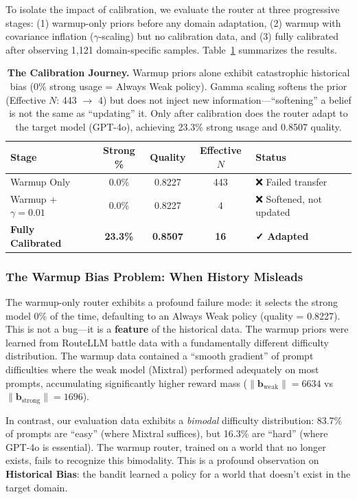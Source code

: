 To isolate the impact of calibration, we evaluate the router at three progressive stages: (1) warmup-only priors before any domain adaptation, (2) warmup with covariance inflation ($\gamma$-scaling) but no calibration data, and (3) fully calibrated after observing 1,121 domain-specific samples. Table~\ref{tab:calibration_stages} summarizes the results.

\begin{table}[h]
\centering
\small
\begin{tabular}{@{}lcccl@{}}
\toprule
\textbf{Stage} & \textbf{Strong \%} & \textbf{Quality} & \textbf{Effective $N$} & \textbf{Status} \\ \midrule
Warmup Only & 0.0\% & 0.8227 & 443 & ❌ Failed transfer \\
Warmup + $\gamma=0.01$ & 0.0\% & 0.8227 & 4 & ❌ Softened, not updated \\
\textbf{Fully Calibrated} & \textbf{23.3\%} & \textbf{0.8507} & \textbf{16} & \textbf{✓ Adapted} \\
\bottomrule
\end{tabular}
\caption{\textbf{The Calibration Journey.} Warmup priors alone exhibit catastrophic historical bias (0\% strong usage = Always Weak policy). Gamma scaling softens the prior (Effective $N$: 443 $\to$ 4) but does not inject new information—``softening'' a belief is not the same as ``updating'' it. Only after calibration does the router adapt to the target model (GPT-4o), achieving 23.3\% strong usage and 0.8507 quality.}
\label{tab:calibration_stages}
\end{table}

\subsubsection{The Warmup Bias Problem: When History Misleads}

The warmup-only router exhibits a profound failure mode: it selects the strong model 0\% of the time, defaulting to an Always Weak policy (quality = 0.8227). This is not a bug—it is a \textbf{feature} of the historical data. The warmup priors were learned from RouteLLM battle data with a fundamentally different difficulty distribution. The warmup data contained a ``smooth gradient'' of prompt difficulties where the weak model (Mixtral) performed adequately on most prompts, accumulating significantly higher reward mass ($\|\mathbf{b}_{\text{weak}}\| = 6634$ vs $\|\mathbf{b}_{\text{strong}}\| = 1696$).

In contrast, our evaluation data exhibits a \emph{bimodal} difficulty distribution: 83.7\% of prompts are ``easy'' (where Mixtral suffices), but 16.3\% are ``hard'' (where GPT-4o is essential). The warmup router, trained on a world that no longer exists, fails to recognize this bimodality. This is a profound observation on \textbf{Historical Bias}: the bandit learned a policy for a world that doesn't exist in the target domain.

